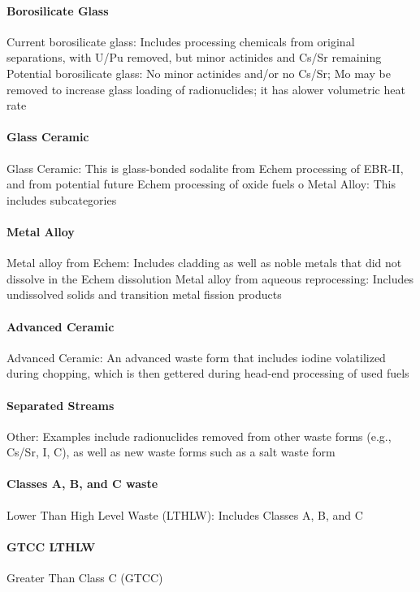 \paragraph{Borosilicate Glass} Current borosilicate glass: Includes processing 
chemicals from original separations, with U/Pu removed, but minor actinides and 
Cs/Sr remaining Potential borosilicate glass: No minor actinides and/or no 
Cs/Sr; Mo may be removed to increase glass loading of radionuclides; it has 
alower volumetric heat rate


\paragraph{Glass Ceramic} Glass Ceramic:  This is glass-bonded sodalite from 
Echem processing of EBR-II, and from potential future Echem processing of oxide 
fuels o Metal Alloy: This includes subcategories


\paragraph{Metal Alloy} Metal alloy from Echem: Includes cladding as well as 
noble metals that did not dissolve in the Echem dissolution Metal alloy from 
aqueous reprocessing:  Includes undissolved solids and transition metal fission 
products


\paragraph{Advanced Ceramic} Advanced Ceramic: An advanced waste form that 
includes iodine volatilized during chopping, which is then gettered during 
head-end processing of used fuels


\paragraph{Separated Streams} Other:  Examples include radionuclides removed 
from other waste forms (e.g., Cs/Sr, I, C), as well as new waste forms such as a 
salt waste form

\paragraph{Classes A, B, and C waste} Lower Than High Level Waste (LTHLW): 
Includes Classes A, B, and C

\paragraph{GTCC LTHLW}  Greater Than Class C (GTCC)



